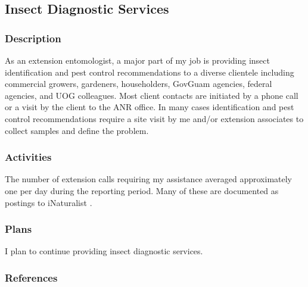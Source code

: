 \subsection{Insect Diagnostic Services}
\begin{refsection}

\subsubsection{Description}	
As an extension entomologist, a major part of my job is providing
insect identification and pest control recommendations to a diverse
clientele including commercial growers, gardeners, householders, GovGuam
agencies, federal agencies, and UOG colleagues. Most client contacts
are initiated by a phone call or a visit by the client to the ANR
office. In many cases identification and pest control recommendations
require a site visit by me and/or extension associates to collect
samples and define the problem.

\subsubsection{Activities}

The number of extension calls requiring my assistance averaged approximately
one per day during the reporting period. Many of these are documented
as postings to iNaturalist \cite{moore_inat_since_2020-06-15}.

\subsubsection{Plans}

I plan to continue providing insect diagnostic services.

\subsubsection{References}

\printbibliography[heading=none]
\end{refsection}

